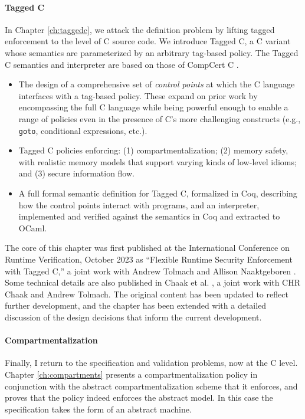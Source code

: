 \documentclass{report}
\begin{document}
\paragraph{Tagged C}

In Chapter \ref{ch:taggedc}, we attack the definition problem by lifting tagged enforcement
to the level of C source code. We introduce Tagged C, a C variant whose semantics are parameterized
by an arbitrary tag-based policy. The Tagged C semantics and interpreter are based on those of
CompCert C \cite{Leroy09:CompCert}.

\begin{itemize}
\item The design of a comprehensive set of {\em control points} at which the C language interfaces
  with a tag-based policy. These expand on prior work by encompassing the full C language
  while being powerful enough to enable a range of policies even in the presence of C's more
  challenging constructs (e.g., {\tt goto}, conditional expressions, etc.).
\item Tagged C policies enforcing: (1) compartmentalization;
  (2) memory safety, with realistic memory models that support varying kinds of low-level idioms;
  and (3) secure information flow.
\item A full formal semantic definition for Tagged C, formalized in Coq, describing how the
  control points interact with programs, and an interpreter, implemented and verified against
  the semantics in Coq and extracted to OCaml.
\end{itemize}

The core of this chapter was first published at the International Conference on Runtime Verification,
October 2023 as ``Flexible Runtime Security Enforcement with Tagged C,'' a joint work
with Andrew Tolmach and Allison Naaktgeboren \cite{Anderson23:TaggedC}. Some technical
details are also published in Chaak et al. \cite{}, a joint work with CHR Chaak and Andrew Tolmach.
The original content has been updated to reflect further development, and the chapter has been
extended with a detailed discussion of the design decisions that inform the current development.

\paragraph{Compartmentalization}

Finally, I return to the specification and validation problems, now at the C level. Chapter
\ref{ch:compartments} presents a compartmentalization policy in conjunction with the abstract
compartmentalization scheme that it enforces, and proves that the policy indeed enforces the
abstract model. In this case the specification takes the form of an abstract machine.
\end{document}

